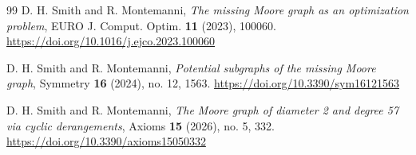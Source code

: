\documentclass[11pt]{article}
\theoremstyle{plain}
\theoremstyle{remark}
\begin{document}
\begin{thebibliography}{99}
D. H. Smith and R. Montemanni,
\emph{The missing Moore graph as an optimization problem},
EURO J. Comput. Optim. \textbf{11} (2023), 100060.
\url{https://doi.org/10.1016/j.ejco.2023.100060}

D. H. Smith and R. Montemanni,
\emph{Potential subgraphs of the missing Moore graph},
Symmetry \textbf{16} (2024), no. 12, 1563.
\url{https://doi.org/10.3390/sym16121563}

D. H. Smith and R. Montemanni,
\emph{The Moore graph of diameter 2 and degree 57 via cyclic derangements},
Axioms \textbf{15} (2026), no. 5, 332.
\url{https://doi.org/10.3390/axioms15050332}

\end{thebibliography}
\end{document}
